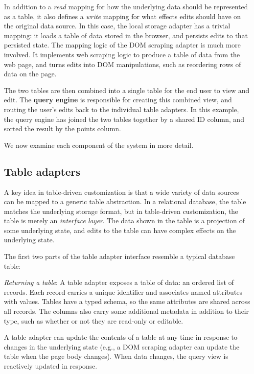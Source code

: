 \documentclass[sigplan,screen,10pt,anonymous,review]{acmart}
\begin{document}
In addition to a \emph{read} mapping for how the underlying data should
be represented as a table, it also defines a \emph{write} mapping for
what effects edits should have on the original data source. In this
case, the local storage adapter has a trivial mapping: it loads a table
of data stored in the browser, and persists edits to that persisted
state. The mapping logic of the DOM scraping adapter is much more
involved. It implements web scraping logic to produce a table of data
from the web page, and turns edits into DOM manipulations, such as
reordering rows of data on the page.

The two tables are then combined into a single table for the end user to
view and edit. The \textbf{query engine} is responsible for creating
this combined view, and routing the user's edits back to the individual
table adapters. In this example, the query engine has joined the two
tables together by a shared ID column, and sorted the result by the
points column.

We now examine each component of the system in more detail.

\hypertarget{table-adapters}{%
\subsection{Table adapters}\label{table-adapters}}

A key idea in table-driven customization is that a wide variety of data
sources can be mapped to a generic table abstraction. In a relational
database, the table matches the underlying storage format, but in
table-driven customization, the table is merely an \emph{interface
layer}. The data shown in the table is a projection of some underlying
state, and edits to the table can have complex effects on the underlying
state.

The first two parts of the table adapter interface resemble a typical
database table:

\emph{Returning a table}: A table adapter exposes a table of data: an
ordered list of records. Each record carries a unique identifier and
associates named attributes with values. Tables have a typed schema, so
the same attributes are shared across all records. The columns also
carry some additional metadata in addition to their type, such as
whether or not they are read-only or editable.

A table adapter can update the contents of a table at any time in
response to changes in the underlying state (e.g., a DOM scraping
adapter can update the table when the page body changes). When data
changes, the query view is reactively updated in response.
\end{document}
